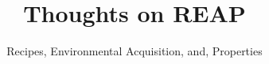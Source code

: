 \documentclass[preprint,10pt,nonatbib]{sigplanconf}
\title{Thoughts on REAP}
\subtitle{Recipes, Environmental Acquisition, and, Properties}
\begin{document}
\maketitle
\eject

\begin{abstract}
  
\end{abstract}

\label{section:tutorial}


\small

\end{document}
